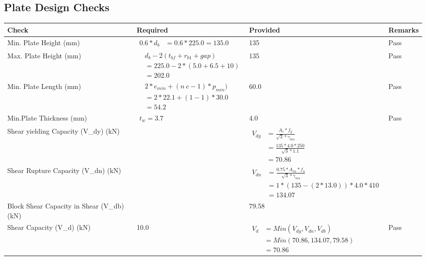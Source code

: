 \documentclass{article}%
\begin{document}
\subsection{Plate Design Checks}%
\label{subsec:PlateDesignChecks}%
\renewcommand{\arraystretch}{1.2}%
\begin{longtable}{|p{4cm}|p{5cm}|p{5.5cm}|p{1.5cm}|}%
\hline%
\rowcolor{OsdagGreen}%
Check&Required&Provided&Remarks\\%
\hline%
\endhead%
\hline%
Min. Plate Height (mm)&$\begin{aligned}0.6 * d_b&= 0.6 * 225.0=135.0\end{aligned}$&135&Pass\\%
\hline%
Max. Plate Height (mm)&$\begin{aligned} &d_b - 2 (t_{bf} + r_{b1} + gap)\\ &=225.0- 2* (5.0+6.5+ 10)\\ &=202.0\end{aligned}$&135&Pass\\%
\hline%
Min. Plate Length (mm)&$\begin{aligned} &2*e_{min} + (n~c-1) * p_{min})\\ &=2*22.1+(1-1) * 30.0\\ &=54.2\end{aligned}$&60.0&Pass\\%
\hline%
Min.Plate Thickness (mm)&$\begin{aligned} t_w=3.7\end{aligned}$&4.0&Pass\\%
\hline%
Shear yielding Capacity (V\_dy) (kN)&&$\begin{aligned} V_{dg} &= \frac{A_v*f_y}{\sqrt{3}*\gamma_{mo}}\\ &=\frac{135*4.0*250}{\sqrt{3}*1.1}\\ &=70.86\end{aligned}$&\\%
\hline%
Shear Rupture Capacity (V\_dn) (kN)&&$\begin{aligned} V_{dn} &= \frac{0.75*A_{vn}*f_u}{\sqrt{3}*\gamma_{mo}}\\ &=1*(135-(2*13.0))*4.0*410\\ &=134.07\end{aligned}$&\\%
\hline%
Block Shear Capacity in Shear (V\_db) (kN)&&79.58&\\%
\hline%
Shear Capacity (V\_d) (kN)&10.0&$\begin{aligned} V_d &= Min(V_{dy},V_{dn},V_{db})\\ &= Min(70.86,134.07,79.58)\\ &=70.86\end{aligned}$&Pass\\%

\end{longtable}
\end{document}
